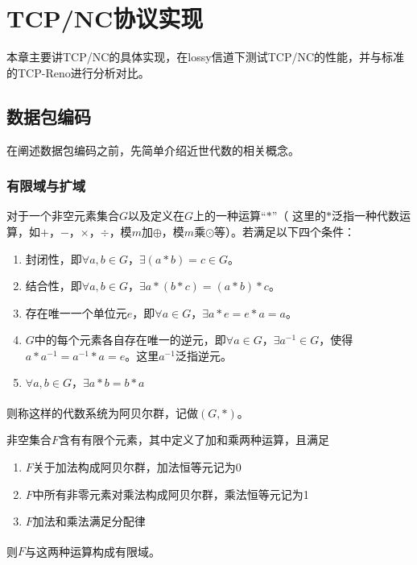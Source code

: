 \chapter{TCP/NC协议实现}
本章主要讲TCP/NC的具体实现，在lossy信道下测试TCP/NC的性能，并与标准的TCP-Reno进行分析对比。
\section{数据包编码}
在阐述数据包编码之前，先简单介绍近世代数的相关概念。
\subsection{有限域与扩域}
\begin{myDef}[阿贝尔群]
	对于一个非空元素集合$G$以及定义在$G$上的一种运算“$*$”（ 这里的$*$泛指一种代数运算，如$+$，$-$，$\times$，$\div$，模$m$加$\oplus$，模$m$乘$\odot$等）。若满足以下四个条件：
	\begin{enumerate}[fullwidth,itemindent=2em,label=(\arabic*)]
		\item 封闭性，即$\forall a,b \in G$，$\exists\left(a*b\right)=c\in G$。
		\item 结合性，即$\forall a,b \in G$，$\exists a*\left(b*c\right)=\left(a*b\right)*c$。
		\item 存在唯一一个单位元$e$，即$\forall a \in G$，$\exists a*e=e*a=a$。
		\item $G$中的每个元素各自存在唯一的逆元，即$\forall a \in G$，$\exists {a^{ - 1}} \in G$，使得$a*{a^{-1}}={a^{-1}}*a=e$。这里${a^{-1}}$泛指逆元。
		\item $\forall a,b \in G$，$\exists a*b=b*a$
	\end{enumerate}
	\par
	则称这样的代数系统为阿贝尔群，记做$\left(G,*\right)$\textsuperscript{\cite{zzc2003}}。
\end{myDef}
\begin{myDef}[有限域]
	非空集合$F$含有有限个元素，其中定义了加和乘两种运算，且满足
	\begin{enumerate}[fullwidth,itemindent=2em,label=(\arabic*)]
		\item $F$关于加法构成阿贝尔群，加法恒等元记为0
		\item $F$中所有非零元素对乘法构成阿贝尔群，乘法恒等元记为1
		\item $F$加法和乘法满足分配律
	\end{enumerate}
	\par
	则$F$与这两种运算构成有限域\textsuperscript{\cite{zzc2003}}。
\end{myDef}
